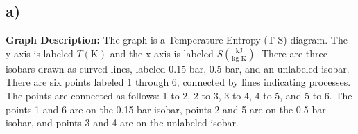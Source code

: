

\subsection*{a)}

\textbf{Graph Description:} The graph is a Temperature-Entropy (T-S) diagram. The y-axis is labeled $T(\text{K})$ and the x-axis is labeled $S \left( \frac{\text{kJ}}{\text{kg K}} \right)$. There are three isobars drawn as curved lines, labeled 0.15 bar, 0.5 bar, and an unlabeled isobar. There are six points labeled 1 through 6, connected by lines indicating processes. The points are connected as follows: 1 to 2, 2 to 3, 3 to 4, 4 to 5, and 5 to 6. The points 1 and 6 are on the 0.15 bar isobar, points 2 and 5 are on the 0.5 bar isobar, and points 3 and 4 are on the unlabeled isobar.